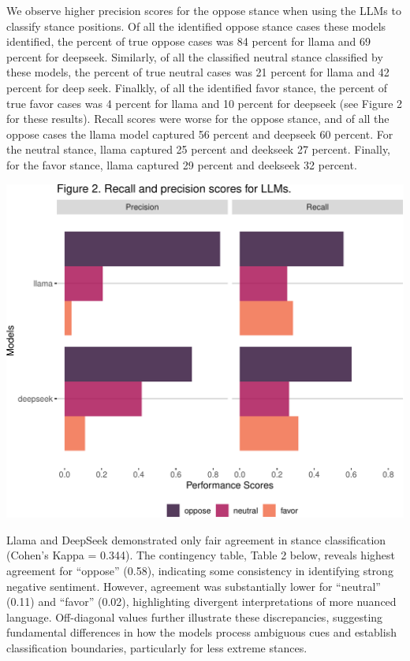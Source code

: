 \documentclass[
  12pt]{article}
\begin{document}
We observe higher precision scores for the oppose stance when using the
LLMs to classify stance positions. Of all the identified oppose stance
cases these models identified, the percent of true oppose cases was 84
percent for llama and 69 percent for deepseek. Similarly, of all the
classified neutral stance classified by these models, the percent of
true neutral cases was 21 percent for llama and 42 percent for deep
seek. Finalkly, of all the identified favor stance, the percent of true
favor cases was 4 percent for llama and 10 percent for deepseek (see
Figure 2 for these results). Recall scores were worse for the oppose
stance, and of all the oppose cases the llama model captured 56 percent
and deepseek 60 percent. For the neutral stance, llama captured 25
percent and deekseek 27 percent. Finally, for the favor stance, llama
captured 29 percent and deekseek 32 percent.

\hfill\break

\includegraphics{assign_3_files/figure-pdf/unnamed-chunk-5-1.pdf}

Llama and DeepSeek demonstrated only fair agreement in stance
classification (Cohen's Kappa = 0.344). The contingency table, Table 2
below, reveals highest agreement for ``oppose'' (0.58), indicating some
consistency in identifying strong negative sentiment. However, agreement
was substantially lower for ``neutral'' (0.11) and ``favor'' (0.02),
highlighting divergent interpretations of more nuanced language.
Off-diagonal values further illustrate these discrepancies, suggesting
fundamental differences in how the models process ambiguous cues and
establish classification boundaries, particularly for less extreme
stances.
\end{document}
